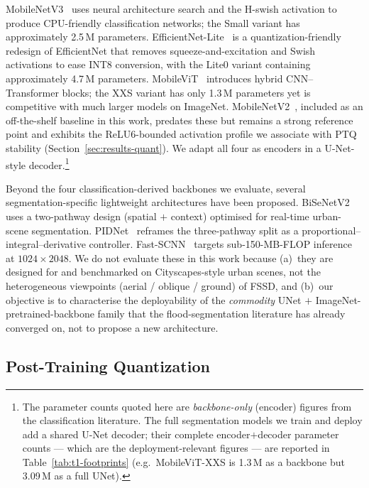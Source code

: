MobileNetV3~\cite{howard2019searching} uses neural architecture search and the H-swish activation to produce CPU-friendly classification networks; the Small variant has approximately 2.5\,M parameters. EfficientNet-Lite~\cite{tan2019efficientnet} is a quantization-friendly redesign of EfficientNet that removes squeeze-and-excitation and Swish activations to ease INT8 conversion, with the Lite0 variant containing approximately 4.7\,M parameters. MobileViT~\cite{mehta2022mobilevit} introduces hybrid CNN--Transformer blocks; the XXS variant has only 1.3\,M parameters yet is competitive with much larger models on ImageNet. MobileNetV2~\cite{sandler2018mobilenetv2}, included as an off-the-shelf baseline in this work, predates these but remains a strong reference point and exhibits the ReLU6-bounded activation profile we associate with PTQ stability (Section~\ref{sec:results-quant}). We adapt all four as encoders in a U-Net-style decoder.\footnote{The parameter counts quoted here are \emph{backbone-only} (encoder) figures from the classification literature. The full segmentation models we train and deploy add a shared U-Net decoder; their complete encoder$+$decoder parameter counts --- which are the deployment-relevant figures --- are reported in Table~\ref{tab:t1-footprints} (e.g.\ MobileViT-XXS is 1.3\,M as a backbone but 3.09\,M as a full UNet).}

Beyond the four classification-derived backbones we evaluate, several segmentation-specific lightweight architectures have been proposed. BiSeNetV2~\cite{yu2021bisenetv2} uses a two-pathway design (spatial $+$ context) optimised for real-time urban-scene segmentation. PIDNet~\cite{xu2023pidnet} reframes the three-pathway split as a proportional--integral--derivative controller. Fast-SCNN~\cite{poudel2019fastscnn} targets sub-150-MB-FLOP inference at $1024{\times}2048$. We do not evaluate these in this work because (a)~they are designed for and benchmarked on Cityscapes-style urban scenes, not the heterogeneous viewpoints (aerial / oblique / ground) of FSSD, and (b)~our objective is to characterise the deployability of the \emph{commodity} UNet $+$ ImageNet-pretrained-backbone family that the flood-segmentation literature has already converged on, not to propose a new architecture.

\subsection{Post-Training Quantization}
\label{sec:rw-ptq}

